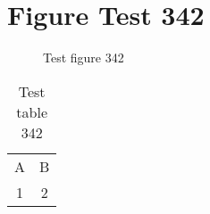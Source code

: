 \documentclass{article}
\begin{document}
\section{Figure Test 342}
\begin{figure}[h]
\caption{Test figure 342}
\end{figure}
\begin{table}[h]
\caption{Test table 342}
\begin{tabular}{cc}
A & B \\
1 & 2
\end{tabular}
\end{table}
\end{document}
